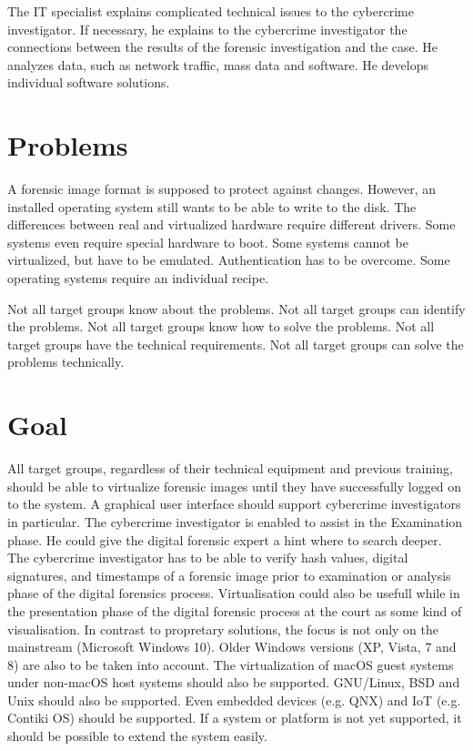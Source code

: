The IT specialist explains complicated technical issues to the cybercrime investigator. If necessary, he explains to the cybercrime investigator the connections between the results of the forensic investigation and the case. He analyzes data, such as network traffic, mass data and software. He develops individual software solutions.

\section{Problems}

A forensic image format is supposed to protect against changes. However, an installed operating system still wants to be able to write to the disk. The differences between real and virtualized hardware require different drivers. Some systems even require special hardware to boot. Some systems cannot be virtualized, but have to be emulated. Authentication has to be overcome. Some operating systems require an individual recipe.

Not all target groups know about the problems. Not all target groups can identify the problems. Not all target groups know how to solve the problems. Not all target groups have the technical requirements. Not all target groups can solve the problems technically.

\section{Goal}


All target groups, regardless of their technical equipment and previous training, should be able to virtualize forensic images until they have successfully logged on to the system.
A graphical user interface should support cybercrime investigators in particular.
The cybercrime investigator is enabled to assist in the Examination phase. \cite{Aarnes2017:34} %
He could give the digital forensic expert a hint where to search deeper.
The cybercrime investigator has to be able to verify hash values, digital signatures, and timestamps of a forensic image prior to examination or analysis phase of the digital forensics process.
Virtualisation could also be usefull while in the presentation phase of the digital forensic process at the court as some kind of visualisation. \cite{Aarnes2017:46} %
In contrast to propretary solutions, the focus is not only on the mainstream (Microsoft Windows 10). Older Windows versions (XP, Vista, 7 and 8) are also to be taken into account. The virtualization of macOS guest systems under non-macOS host systems should also be supported. GNU/Linux, BSD and Unix should also be supported. Even embedded devices (e.g. QNX) and IoT (e.g. Contiki OS) should be supported.
If a system or platform is not yet supported, it should be possible to extend the system easily.

